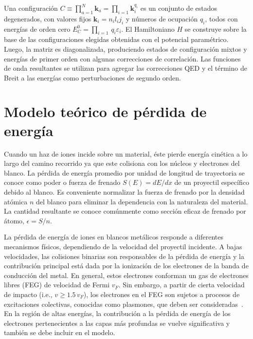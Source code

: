 Una configuración 
$C\equiv\prod_{a=1}^N\mathbf{k}_a=\prod_{i=1}\mathbf{k}_i^{q_i}$ es un 
conjunto de estados degenerados, con valores fijos 
$\mathbf{k}_i=n_il_ij_i$
y números de ocupación $q_i$, todos con energías de orden cero 
$E_C^0=\prod_{i=1}\,q_i\varepsilon_i$. 
El Hamiltoniano $H$ se construye sobre la base de las configuraciones 
elegidas obtenidas con el potencial paramétrico. Luego, la matriz es 
diagonalizada, produciendo estados de configuración mixtos y energías 
de primer orden con algunas correcciones de correlación. Las funciones 
de onda resultantes se utilizan para agregar las correcciones QED y el 
término de Breit a las energías como perturbaciones de segundo orden.

\section{Modelo teórico de pérdida de energía}
\label{sec:method-stopping}

Cuando un haz de iones incide sobre un material, éste pierde energía 
cinética a lo largo del camino recorrido ya que este colisiona con los 
núcleos y electrones del blanco. La pérdida de energía promedio 
por unidad de longitud de trayectoria se conoce como poder o fuerza de 
frenado $S(E)=dE/dx$ de un proyectil específico debido al blanco. Es 
conveniente normalizar la fuerza de frenado por la densidad atómica 
$n$ del blanco para eliminar la dependencia con la naturaleza del 
material. La cantidad resultante se conoce comúnmente como sección 
eficaz de frenado por átomo, $\epsilon=S/n$. 

La pérdida de energía de iones en blancos metálicos responde a 
diferentes mecanismos físicos, dependiendo de la velocidad del proyectil 
incidente. A bajas velocidades, las colisiones binarias son responsables 
de la pérdida de energía y la contribución principal está dada por la 
ionización de los electrones de la banda de conducción del metal. En 
general, estos electrones conforman un gas de electrones libres (FEG) 
de velocidad de Fermi $v_F$. Sin embargo, a partir de cierta velocidad 
de impacto (i.e., $v\geq 1.5\,v_F$), los electrones en el FEG son 
sujetos a procesos de excitaciones colectivas, conocidas como plasmones, 
que deben ser consideradas~\cite{Montanari:17}. En la región de altas 
energías, la contribución a la pérdida de energía de los electrones 
pertenecientes a las capas más profundas se vuelve significativa y 
también se debe incluir en el modelo.


